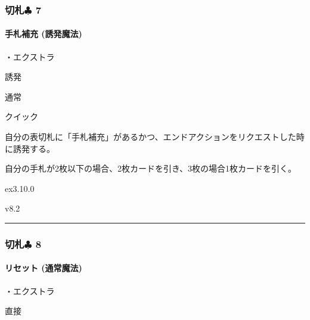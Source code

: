 \documentclass[letterpaper,10pt,dvipdfmx]{sphinxmanual}
\begin{document}
\subsubsection{切札{\normalsize $\clubsuit$} 7}
\label{\detokenize{auto/frameActionlist:id74}}

\paragraph{手札補充 (誘発魔法)}
\label{\detokenize{auto/frameActionlist:act-handrefill}}\label{\detokenize{auto/frameActionlist:id75}}
\sphinxAtStartPar
{}

\sphinxAtStartPar
・エクストラ

\sphinxAtStartPar
{} 誘発

\sphinxAtStartPar
{} 通常

\sphinxAtStartPar
{} クイック

\sphinxAtStartPar
{}

\sphinxAtStartPar
自分の表切札に「手札補充」があるかつ、エンドアクションをリクエストした時に誘発する。

\sphinxAtStartPar
{}

\sphinxAtStartPar
自分の手札が2枚以下の場合、2枚カードを引き、3枚の場合1枚カードを引く。

\sphinxAtStartPar
{}  ex3.10.0

\sphinxAtStartPar
{}  v8.2


\bigskip\hrule\bigskip



\subsubsection{切札{\normalsize $\clubsuit$} 8}
\label{\detokenize{auto/frameActionlist:id76}}

\paragraph{リセット (通常魔法)}
\label{\detokenize{auto/frameActionlist:act-reset}}\label{\detokenize{auto/frameActionlist:id77}}
\sphinxAtStartPar
{}

\sphinxAtStartPar
・エクストラ

\sphinxAtStartPar
{} 直接
\end{document}

